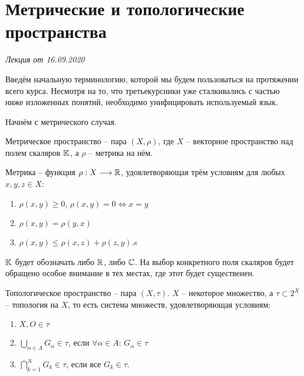 \section{Метрические и топологические пространства}

\hfill \emph{Лекция от 16.09.2020}

Введём начальную терминологию, которой мы будем пользоваться на протяжении всего курса. Несмотря на то, что третьекурсники уже
сталкивались с частью ниже изложенных понятий, необходимо унифицировать используемый язык.

Начнём с метрического случая.

\begin{Def}
    Метрическое пространство -- пара $\left( X, \rho \right)$, где $X$ -- векторное пространство над полем скаляров ${\mathbb{K}}$, а 
    $\rho$ -- метрика на нём.
\end{Def}

\begin{Def}
    Метрика -- функция $\rho: X \longrightarrow {\mathbb{R}}$, удовлетворяющая трём условиям для любых $x, y, z \in X$:

    \begin{enumerate}
        \item $\rho(x, y) \geq 0$, $\rho(x, y) = 0 \iff x = y$
        \item $\rho(x, y) = \rho(y, x)$
        \item $\rho(x, y) \leq \rho(x, z) + \rho(z, y)$.s
    \end{enumerate}
\end{Def}

${\mathbb{K}}$ будет обозначать либо ${\mathbb{R}}$, либо ${\mathbb{C}}$. На выбор конкретного поля скаляров будет обращено особое внимание в тех местах, где этот
 будет существенен.

\begin{Def}
    Топологическое пространство -- пара $(X, \tau)$. $X$ -- некоторое множество, а $\tau \subset 2^X$ -- топология на $X$, то есть система множеств, удовлетворяющая условиям:

    \begin{enumerate}
        \item $X, O \in \tau$
        \item $\bigcup\limits_{\alpha \in A} G_{\alpha} \in \tau$, если $\forall \alpha \in A: \, G_{\alpha} \in \tau$
        \item $\bigcap\limits_{k=1}^{N} G_k \in \tau$, если все $G_k \in \tau$.
    \end{enumerate}
\end{Def}

